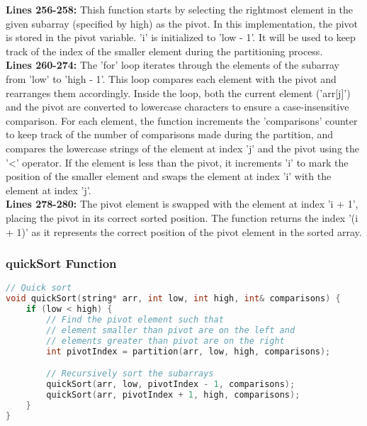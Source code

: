 \documentclass[letterpaper, 10pt,DIV=13]{scrartcl}
\numberwithin{equation}{section} %
\numberwithin{figure}{section} %
\numberwithin{table}{section} %
\begin{document}
\textbf{Lines 256-258:} Thish function starts by selecting the rightmost element in the given subarray (specified by high) as the pivot. In this implementation, the pivot is stored in the pivot variable. 'i' is initialized to 'low - 1'. It will be used to keep track of the index of the smaller element during the partitioning process. \\
\textbf{Lines 260-274:} The 'for' loop iterates through the elements of the subarray from 'low' to 'high - 1'. This loop compares each element with the pivot and rearranges them accordingly. Inside the loop, both the current element ('arr[j]') and the pivot are converted to lowercase characters to ensure a case-insensitive comparison. For each element, the function increments the 'comparisons' counter to keep track of the number of comparisons made during the partition, and compares the lowercase strings of the element at index 'j' and the pivot using the '<' operator. If the element is less than the pivot, it increments 'i' to mark the position of the smaller element and swaps the element at index 'i' with the element at index 'j'. \\
\textbf{Lines 278-280:} The pivot element is swapped with the element at index 'i + 1', placing the pivot in its correct sorted position. The function returns the index '(i + 1)' as it represents the correct position of the pivot element in the sorted array.

\subsubsection{quickSort Function}
\begin{linenumbers}
\begin{lstlisting}[language=C++, caption={quickSort Function}, label={code:example}]
// Quick sort
void quickSort(string* arr, int low, int high, int& comparisons) {
    if (low < high) {
        // Find the pivot element such that
        // element smaller than pivot are on the left and
        // elements greater than pivot are on the right
        int pivotIndex = partition(arr, low, high, comparisons);

        // Recursively sort the subarrays
        quickSort(arr, low, pivotIndex - 1, comparisons);
        quickSort(arr, pivotIndex + 1, high, comparisons);
    }
}
\end{lstlisting}
\end{linenumbers}
\nolinenumbers
\end{document}
